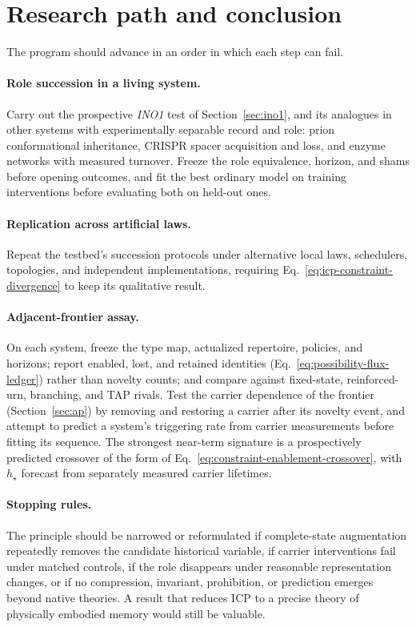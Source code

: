 \section{Research path and conclusion}
\label{sec:path}

The program should advance in an order in which each step can fail.

\paragraph{Role succession in a living system.} Carry out the prospective
\textit{INO1} test of Section~\ref{sec:ino1}, and its analogues in other
systems with experimentally separable record and role: prion conformational
inheritance, CRISPR spacer acquisition and loss, and enzyme networks with
measured turnover. Freeze the role equivalence, horizon, and shams before
opening outcomes, and fit the best ordinary model on training interventions
before evaluating both on held-out ones.

\paragraph{Replication across artificial laws.} Repeat the testbed's
succession protocols under alternative local laws, schedulers, topologies, and
independent implementations, requiring
Eq.~\eqref{eq:icp-constraint-divergence} to keep its qualitative result.

\paragraph{Adjacent-frontier assay.} On each system, freeze the type map,
actualized repertoire, policies, and horizons; report enabled, lost, and
retained identities (Eq.~\eqref{eq:possibility-flux-ledger}) rather than novelty
counts; and compare against fixed-state, reinforced-urn, branching, and TAP
rivals. Test the carrier dependence of the frontier
(Section~\ref{sec:ap}) by removing and restoring a carrier after its novelty
event, and attempt to predict a system's triggering rate from carrier
measurements before fitting its sequence. The strongest near-term signature is a prospectively predicted
crossover of the form of Eq.~\eqref{eq:constraint-enablement-crossover}, with
$h_\star$ forecast from separately measured carrier lifetimes.

\paragraph{Stopping rules.} The principle should be narrowed or reformulated
if complete-state augmentation repeatedly removes the candidate historical
variable, if carrier interventions fail under matched controls, if the role
disappears under reasonable representation changes, or if no compression,
invariant, prohibition, or prediction emerges beyond native theories. A result
that reduces ICP to a precise theory of physically embodied memory would still
be valuable.

